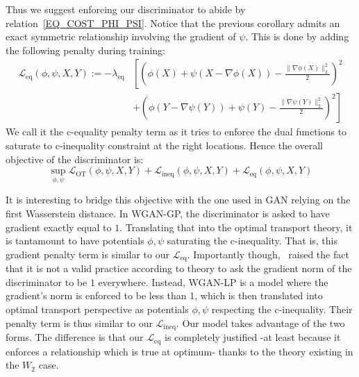 \documentclass[runningheads]{llncs}
\newcommand\mycitet[1]{\cite{#1}}
\begin{document}
Thus we suggest enforcing our discriminator to abide by relation~\eqref{EQ_COST_PHI_PSI}. Notice that the previous corollary admits an exact symmetric relationship involving the gradient of $\psi$. This is done by adding the following penalty during training:
\begin{align}
\mathcal{L}_{\text{eq}}(\phi,\psi,X,Y):=
-\lambda_{\text{eq}}& \left[ \left(\phi(X) + \psi(X-\nabla \phi(X)) -\frac{\|\nabla \phi(X)\|_2^2}{2}\right)^2 \right. \nonumber \\
& \left. + \left(\phi(Y-\nabla \psi(Y)) + \psi(Y) -\frac{\|\nabla \psi(Y)\|_2^2}{2}\right)^2 \right]
\label{GAN_EQ_PENALTY}
\end{align}
We call it the c-equality penalty term as it tries to enforce the dual functions to saturate to c-inequality constraint at the right locations. Hence the overall objective of the discriminator is:
\begin{equation}
    \sup_{\phi,\psi} \mathcal{L}_{\text{OT}}(\phi,\psi,X,Y) + \mathcal{L}_{\text{ineq}}(\phi,\psi,X,Y) + \mathcal{L}_{\text{eq}}(\phi,\psi,X,Y)
\label{DISCRIMINATOR_LOSS_EQ_INEQ}
\end{equation}

\begin{remark}
\normalfont It is interesting to bridge this objective with the one used in GAN relying on the first Wasserstein distance. In WGAN-GP, the discriminator is asked to have gradient exactly equal to $1$. Translating that into the optimal transport theory, it is tantamount to have potentials $\phi,\psi$ saturating the c-inequality. That is, this gradient penalty term is similar to our $\mathcal{L}_{\text{eq}}$. Importantly though,~\mycitet{petzka2018on} raised the fact that it is not a valid practice according to theory to ask the gradient norm of the discriminator to be $1$ everywhere. Instead, WGAN-LP is a model where the gradient's norm is enforced to be less than 1, which is then translated into optimal transport perspective as potentials $\phi,\psi$ respecting the c-inequality. Their penalty term is thus similar to our $\mathcal{L}_{\text{ineq}}$. Our model takes advantage of the two forms. The difference is that our $\mathcal{L}_{\text{eq}}$ is completely justified -at least because it enforces a relationship which is true at optimum- thanks to the theory existing in the $W_2$ case.
\end{remark}
\end{document}
